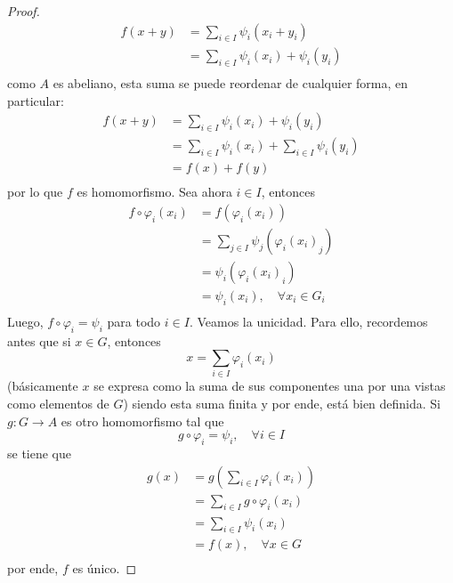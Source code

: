 \documentclass[12pt]{report}
\newcounter{it}
\theoremstyle{largebreak}
\newcommand\cf[3]{\ensuremath{#1:#2\rightarrow#3}}
\begin{document}
\begin{proof}
        \begin{equation*}
            \begin{split}
                f(x+y)&=\sum_{ i\in I}\psi_i(x_i+y_i)\\
                &=\sum_{ i\in I}\psi_i(x_i)+\psi_i(y_i)\\
            \end{split}
        \end{equation*}
        como $A$ es abeliano, esta suma se puede reordenar de cualquier forma, en particular:
        \begin{equation*}
            \begin{split}
                f(x+y)&=\sum_{ i\in I}\psi_i(x_i)+\psi_i(y_i)\\
                &=\sum_{ i\in I}\psi_i(x_i)+\sum_{ i\in I}\psi_i(y_i)\\
                &=f(x)+f(y)\\
            \end{split}
        \end{equation*}
        por lo que $f$ es homomorfismo. Sea ahora $i\in I$, entonces
        \begin{equation*}
            \begin{split}
                f\circ\varphi_i(x_i)&=f(\varphi_i(x_i))\\
                &=\sum_{ j\in I}\psi_j({\varphi_i(x_i)}_j)\\
                &=\psi_i({\varphi_i(x_i)}_i)\\
                &=\psi_i(x_i),\quad\forall x_i\in G_i\\
            \end{split}
        \end{equation*}
        Luego, $f\circ\varphi_i=\psi_i$ para todo $i\in I$. Veamos la unicidad. Para ello, recordemos antes que si $x\in G$, entonces
        \begin{equation*}
            x=\sum_{ i\in I}\varphi_i(x_i)
        \end{equation*}
        (básicamente $x$ se expresa como la suma de sus componentes una por una vistas como elementos de $G$) siendo esta suma finita y por ende, está bien definida. Si $\cf{g}{G}{A}$ es otro homomorfismo tal que
        \begin{equation*}
            g\circ\varphi_i=\psi_i,\quad\forall i\in I
        \end{equation*}
        se tiene que
        \begin{equation*}
            \begin{split}
                g(x)&=g\left(\sum_{ i\in I}\varphi_i(x_i)\right)\\
                &=\sum_{ i\in I} g\circ\varphi_i(x_i)\\
                &=\sum_{ i\in I}\psi_i(x_i)\\
                &=f(x),\quad\forall x\in G\\
            \end{split}
        \end{equation*}
        por ende, $f$ es único.
    \end{proof}
\end{document}
